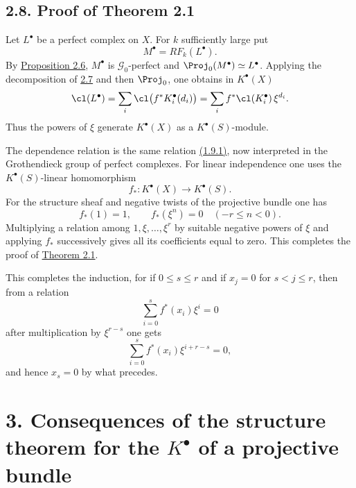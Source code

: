 \subsection*{2.8. Proof of Theorem 2.1}
Let \(L^\bullet\) be a perfect complex on \(X\). For \(k\) sufficiently large put
\[
  M^\bullet=RF_k(L^\bullet).
\]
By \hyperlink{sga6.e06.prop.2-6}{Proposition 2.6}, \(M^\bullet\) is \(\mathcal G_0\)-perfect and \(\Proj_0(M^\bullet)\simeq L^\bullet\). Applying the decomposition of \hyperlink{sga6.e06.sec.2.7}{2.7} and then \(\Proj_0\), one obtains in \(K^\bullet(X)\)
\[
  \cl(L^\bullet)
  =
  \sum_i \cl\bigl(f^*K_i^\bullet(d_i)\bigr)
  =
  \sum_i f^*\cl(K_i^\bullet)\,\xi^{d_i}.
\]
Thus the powers of \(\xi\) generate \(K^\bullet(X)\) as a \(K^\bullet(S)\)-module.

The dependence relation is the same relation \hyperlink{sga6.e06.eq.1-9-1}{(1.9.1)}, now interpreted in the Grothendieck group of perfect complexes. For linear independence one uses the \(K^\bullet(S)\)-linear homomorphism
\[
  f_*:K^\bullet(X)\longrightarrow K^\bullet(S).
\]
For the structure sheaf and negative twists of the projective bundle one has
\[
  f_*(1)=1,\qquad f_*(\xi^n)=0\quad(-r\leq n<0).
\]
Multiplying a relation among \(1,\xi,\ldots,\xi^r\) by suitable negative powers of \(\xi\) and applying \(f_*\) successively gives all its coefficients equal to zero. This completes the proof of \hyperlink{sga6.e06.thm.2-1}{Theorem 2.1}.



\providecommand{\Sym}{\operatorname{Sym}}
\providecommand{\GL}{\operatorname{GL}}
\providecommand{\Grass}{\operatorname{Grass}}
\providecommand{\gr}{\operatorname{gr}}
\providecommand{\ctop}{c_{\mathrm{top}}}
\providecommand{\Rep}{\operatorname{Rep}}
\providecommand{\RZ}{R_{\mathbb Z}}
\providecommand{\Dflag}{D}
\providecommand{\Gmn}{G}


This completes the induction, for if \(0\le s\le r\) and if \(x_j=0\) for \(s<j\le r\), then from a relation
\[
  \sum_{i=0}^{s} f^*(x_i)\xi^i=0
\]
after multiplication by \(\xi^{r-s}\) one gets
\[
  \sum_{i=0}^{s} f^*(x_i)\xi^{i+r-s}=0,
\]
and hence \(x_s=0\) by what precedes.

\section*{3. Consequences of the structure theorem for the \(K^\bullet\) of a projective bundle}

